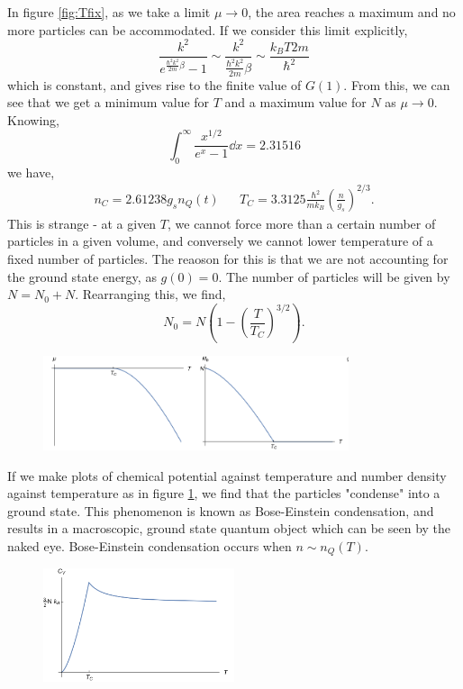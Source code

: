 \documentclass{book}
\begin{document}
In figure \ref{fig:Tfix}, as we take a limit $\mu \to 0$, the area reaches a maximum and no more particles can be accommodated. If we consider this limit explicitly,
\begin{equation}
	\frac{k^2}{e^{\frac{\hbar^2k^2}{2m}\beta}-1} \sim \frac{k^2}{\frac{\hbar^2k^2}{2m}\beta} \sim \frac{k_BT 2m}{\hbar^2}
\end{equation}
which is constant, and gives rise to the finite value of $G(1)$. From this, we can see that we get a minimum value for $T$ and a maximum value for $N$ as $\mu \to 0$. Knowing,
\begin{equation}
	\int_0^{\infty}\frac{x^{1/2}}{e^x -1} \dd{x} = 2.31516
\end{equation}
we have,
\begin{align}
	n_C = 2.61238g_sn_Q(t) && T_C = 3.3125\frac{\hbar^2}{mk_B}\left(\frac{n}{g_s}\right)^{2/3}.
\end{align}
This is strange - at a given $T$, we cannot force more than a certain number of particles in a given volume, and conversely we cannot lower temperature of a fixed number of particles. The reaoson for this is that we are not accounting for the ground state energy, as $g(0) = 0$. The number of particles will be given by $N = N_0 + N$. Rearranging this, we find,
\begin{equation}
	N_0 = N \left( 1 - \left(\frac{T}{T_C}\right)^{3/2}\right).
\end{equation}
\begin{figure}
	\centering
	\includegraphics[width=0.8\textwidth]{cond.png}
	\caption{}
	\label{fig:cond}
\end{figure}
If we make plots of chemical potential against temperature and number density against temperature as in figure \ref{fig:cond}, we find that the particles "condense" into a ground state. This phenomenon is known as Bose-Einstein condensation, and results in a macroscopic, ground state quantum object which can be seen by the naked eye. Bose-Einstein condensation occurs when $n \sim n_Q(T)$.
\begin{figure}[h]
	\centering
	\includegraphics[width=0.5\textwidth]{cV.png}
	\caption{}
	\label{fig:cV}
\end{figure}
\end{document}
